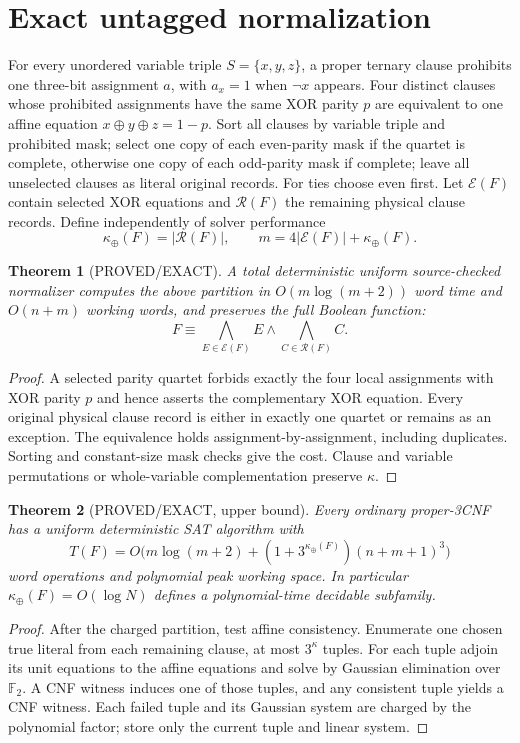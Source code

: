 \documentclass[11pt]{article}
\newtheorem{theorem}{Theorem}
\begin{document}
\section{Exact untagged normalization}
For every unordered variable triple $S=\{x,y,z\}$, a proper ternary clause prohibits one three-bit assignment $a$, with $a_x=1$ when $\neg x$ appears. Four distinct clauses whose prohibited assignments have the same XOR parity $p$ are equivalent to one affine equation $x\oplus y\oplus z=1-p$. Sort all clauses by variable triple and prohibited mask; select one copy of each even-parity mask if the quartet is complete, otherwise one copy of each odd-parity mask if complete; leave all unselected clauses as literal original records. For ties choose even first. Let $\mathcal E(F)$ contain selected XOR equations and $\mathcal R(F)$ the remaining physical clause records. Define independently of solver performance
\[
\boxed{\kappa_{\oplus}(F)=|\mathcal R(F)|,\qquad m=4|\mathcal E(F)|+\kappa_{\oplus}(F).}
\]
\begin{theorem}[PROVED/EXACT]
A total deterministic uniform source-checked normalizer computes the above partition in $O(m\log(m+2))$ word time and $O(n+m)$ working words, and preserves the full Boolean function:
\[
F\equiv\bigwedge_{E\in\mathcal E(F)}E\land\bigwedge_{C\in\mathcal R(F)}C.
\]
\end{theorem}
\begin{proof}
A selected parity quartet forbids exactly the four local assignments with XOR parity $p$ and hence asserts the complementary XOR equation. Every original physical clause record is either in exactly one quartet or remains as an exception. The equivalence holds assignment-by-assignment, including duplicates. Sorting and constant-size mask checks give the cost. Clause and variable permutations or whole-variable complementation preserve $\kappa$.
\end{proof}
\begin{theorem}[PROVED/EXACT, upper bound]
Every ordinary proper-3CNF has a uniform deterministic SAT algorithm with
\[
T(F)=O\big(m\log(m+2)+(1+3^{\kappa_\oplus(F)})(n+m+1)^3\big)
\]
word operations and polynomial peak working space. In particular $\kappa_\oplus(F)=O(\log N)$ defines a polynomial-time decidable subfamily.
\end{theorem}
\begin{proof}
After the charged partition, test affine consistency. Enumerate one chosen true literal from each remaining clause, at most $3^\kappa$ tuples. For each tuple adjoin its unit equations to the affine equations and solve by Gaussian elimination over $\mathbb F_2$. A CNF witness induces one of those tuples, and any consistent tuple yields a CNF witness. Each failed tuple and its Gaussian system are charged by the polynomial factor; store only the current tuple and linear system.
\end{proof}
\end{document}
